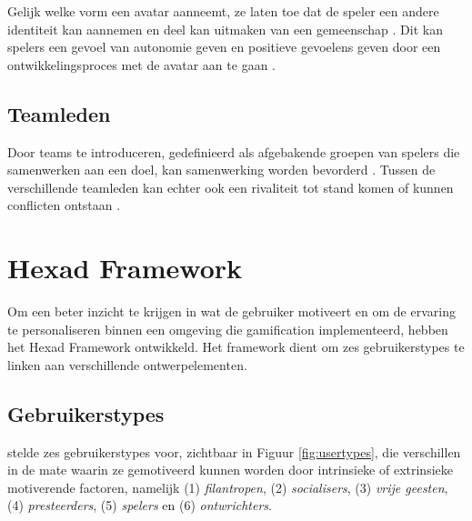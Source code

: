 Gelijk welke vorm een avatar aanneemt, ze laten toe dat de speler een andere identiteit kan aannemen en deel kan uitmaken van een gemeenschap \autocite{Annetta2010}. Dit kan spelers een gevoel van autonomie geven en positieve gevoelens geven door een ontwikkelingsproces met de avatar aan te gaan \autocite{Sailer2013}.

\subsection{Teamleden}

Door teams te introduceren, gedefinieerd als afgebakende groepen van spelers die samenwerken aan een doel, kan samenwerking worden bevorderd \autocite{Sailer2016}. Tussen de verschillende teamleden kan echter ook een rivaliteit tot stand komen of kunnen conflicten ontstaan \autocite{Kapp2012}.

\section{Hexad Framework}

Om een beter inzicht te krijgen in wat de gebruiker motiveert en om de ervaring te personaliseren binnen een omgeving die gamification implementeerd, hebben \textcite{Tondello2016} het Hexad Framework ontwikkeld. Het framework dient om zes gebruikerstypes te linken aan verschillende ontwerpelementen.

\subsection{Gebruikerstypes}

\textcite{Marczewski2015} stelde zes gebruikerstypes voor, zichtbaar in Figuur \ref{fig:usertypes}, die verschillen in de mate waarin ze gemotiveerd kunnen worden door intrinsieke of extrinsieke motiverende factoren, namelijk (1) \textit{filantropen}, (2) \textit{socialisers}, (3) \textit{vrije geesten}, (4) \textit{presteerders}, (5) \textit{spelers} en (6) \textit{ontwrichters}.

